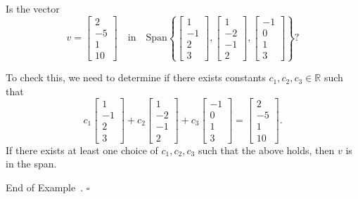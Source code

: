 \documentclass[10pt]{article}
\theoremstyle{definition}
\newtheorem{example}[theorem]{Example}
\renewenvironment{example}
{\begin{oldexample}}
  {\par\smallskip\hfill   End of Example~\theexample. $\square$    \par\end{oldexample}}
\newcommand{\R}{\mathbb{R}}           %
\newcommand{\Span}{\mathrm{Span}} %
\begin{document}
\begin{example}
  Is the vector
  \begin{equation*}
    v=\begin{bmatrix}
      2\\-5\\1\\10
    \end{bmatrix}
  \quad \text{in} \quad 
    \Span \left\{
      \begin{bmatrix}
        1\\-1\\2\\3
      \end{bmatrix},
      \begin{bmatrix}
        1\\-2\\-1\\2
      \end{bmatrix},
      \begin{bmatrix}
        -1\\0\\1\\3
      \end{bmatrix}
    \right\} ?
  \end{equation*}

  To check this, we need to determine if there exists constants
  $c_{1},c_{2},c_{3}\in \R$ such that
  \begin{equation*}
    c_{1}
    \begin{bmatrix}
      1\\-1\\2\\3
    \end{bmatrix}
    +
    c_{2}
    \begin{bmatrix}
      1\\-2\\-1\\2
    \end{bmatrix}
    +
    c_{3}
    \begin{bmatrix}
      -1\\0\\1\\3
    \end{bmatrix}
    =
    \begin{bmatrix}
      2\\-5\\1\\10
    \end{bmatrix}.
  \end{equation*}
  If there exists at least one choice of $c_{1},c_{2},c_{3}$ such that the
  above holds, then $v$ is in the span.
  

\end{example}
\end{document}
